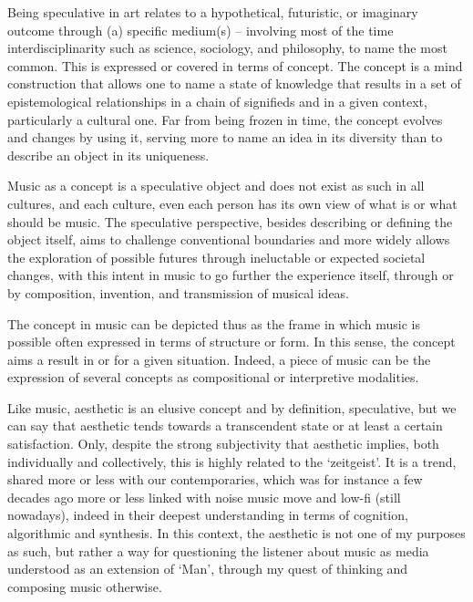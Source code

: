 \documentclass{article}
\begin{document}
Being speculative in art relates to a hypothetical, futuristic, or imaginary outcome through (a) specific medium(s) -- involving most of the time interdisciplinarity such as science, sociology, and philosophy, to name the most common. This is expressed or covered in terms of concept.
The concept is a mind construction that allows one to name a state of knowledge that results in a set of epistemological relationships in a chain of signifieds and in a given context, particularly a cultural one.
Far from being frozen in time, the concept evolves and changes by using it, serving more to name an idea in its diversity than to describe an object in its uniqueness.

Music as a concept is a speculative object and does not exist as such in all cultures, and each culture, even each person has its own view of what is or what should be music.
The speculative perspective, besides describing or defining the object itself, aims to challenge conventional boundaries and more widely allows the exploration of possible futures through ineluctable or expected societal changes, with this intent in music to go further the experience itself, through or by composition, invention, and transmission of musical ideas.

The concept in music can be depicted thus as the frame in which music is possible often expressed in terms of structure or form. In this sense, the concept aims a result in or for a given situation.
Indeed, a piece of music can be the expression of several concepts as compositional or interpretive modalities. 

Like music, aesthetic is an elusive concept and by definition, speculative, but we can say that aesthetic tends towards a transcendent state or at least a certain satisfaction. Only, despite the strong subjectivity that aesthetic implies, both individually and collectively, this is highly related to the `zeitgeist'. It is a trend, shared more or less with our contemporaries, which was for instance a few decades ago more or less linked with noise music move and low-fi (still nowadays), indeed in their deepest understanding in terms of cognition\cite{mem}, algorithmic and synthesis. In this context, the aesthetic is not one of my purposes as such, but rather a way for questioning the listener about music as media understood as an extension of `Man'\cite{um}, through my quest of thinking and composing music otherwise.
\bigskip

\end{document}
